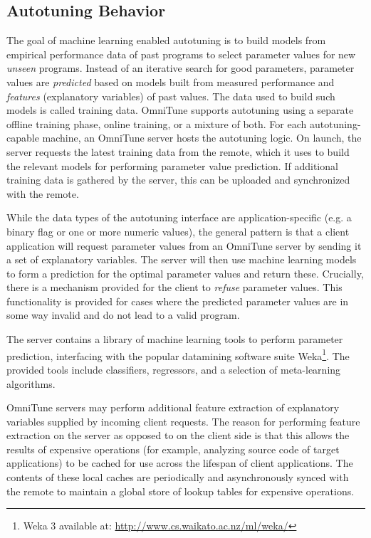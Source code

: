   \subsection{Autotuning Behavior}

  The goal of machine learning enabled autotuning is to build models
  from empirical performance data of past programs to select parameter
  values for new \emph{unseen} programs. Instead of an iterative search
  for good parameters, parameter values are \emph{predicted} based on
  models built from measured performance and \emph{features}
  (explanatory variables) of past values. The data used to build such
  models is called training data. OmniTune supports autotuning using a
  separate offline training phase, online training, or a mixture of
  both. For each autotuning-capable machine, an OmniTune server hosts
  the autotuning logic. On launch, the server requests the latest
  training data from the remote, which it uses to build the relevant
  models for performing parameter value prediction. If additional
  training data is gathered by the server, this can be uploaded and
  synchronized with the remote.

  While the data types of the autotuning interface are
  application-specific (e.g. a binary flag or one or more numeric
  values), the general pattern is that a client application will request
  parameter values from an OmniTune server by sending it a set of
  explanatory variables. The server will then use machine learning
  models to form a prediction for the optimal parameter values and
  return these. Crucially, there is a mechanism provided for the client
  to \emph{refuse} parameter values. This functionality is provided for
  cases where the predicted parameter values are in some way invalid and
  do not lead to a valid program.

  The server contains a library of machine learning tools to perform parameter prediction, interfacing with the popular datamining software suite Weka\footnote{Weka 3 available at:  \url{http://www.cs.waikato.ac.nz/ml/weka/}}. The provided tools include classifiers, regressors, and a selection of meta-learning algorithms.

  OmniTune servers may perform additional feature extraction of
  explanatory variables supplied by incoming client requests. The reason
  for performing feature extraction on the server as opposed to on the
  client side is that this allows the results of expensive operations
  (for example, analyzing source code of target applications) to be
  cached for use across the lifespan of client applications. The
  contents of these local caches are periodically and asynchronously
  synced with the remote to maintain a global store of lookup tables for
  expensive operations.


